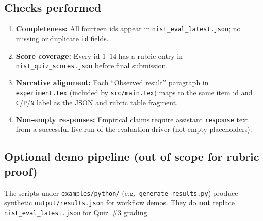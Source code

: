 \subsection{Checks performed}
\begin{enumerate}
  \item \textbf{Completeness:} All fourteen ids appear in \texttt{nist\_eval\_latest.json}; no missing or duplicate \texttt{id} fields.
  \item \textbf{Score coverage:} Every id $1$--$14$ has a rubric entry in \texttt{nist\_quiz\_scores.json} before final submission.
  \item \textbf{Narrative alignment:} Each ``Observed result'' paragraph in \texttt{experiment.tex} (included by \texttt{src/main.tex}) maps to the same item id and \texttt{C}/\texttt{P}/\texttt{N} label as the JSON and rubric table fragment.
  \item \textbf{Non-empty responses:} Empirical claims require assistant \texttt{response} text from a successful live run of the evaluation driver (not empty placeholders).
\end{enumerate}

\subsection{Optional demo pipeline (out of scope for rubric proof)}
The scripts under \texttt{examples/python/} (e.g.\ \texttt{generate\_results.py}) produce synthetic \texttt{output/results.json} for workflow demos. They do \textbf{not} replace \texttt{nist\_eval\_latest.json} for Quiz~\#3 grading.
